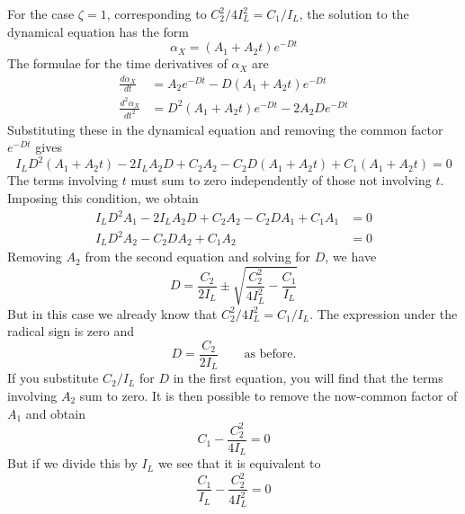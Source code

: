 For the case $\zeta = 1$, corresponding to $C_2^{2}/4I_L^{2} = C_1/I_L$, the
solution to the dynamical equation has the form
\begin{equation}\label{ch2:eq:22}
\alpha_X = (A_1 + A_2 t) e^{-Dt}
\end{equation}
The formulae for the time derivatives of $\alpha_X$ are
\begin{align*}
\frac{d\alpha_X}{dt} &= A_2 e^{-Dt} - D(A_1 + A_2 t) e^{-Dt}\\
\frac{d^{2}\alpha_X}{dt^{2}} &= D^{2}(A_1 + A_2 t) e^{-Dt} - 2A_2 D e^{-Dt}
\end{align*}
Substituting these in the dynamical equation and removing the common factor
$e^{-Dt}$ gives
\begin{equation*}
I_L D^{2}(A_1 + A_2 t) - 2 I_L A_2 D + C_2 A_2 - C_2 D(A_1 + A_2 t)
  + C_1 (A_1 + A_2 t) = 0
\end{equation*}
The terms involving $t$ must sum to zero independently of those not involving
$t$. Imposing this condition, we obtain
\begin{align*}
I_L D^{2} A_1 - 2 I_L A_2 D + C_2 A_2 - C_2 D A_1 + C_1 A_1 &= 0\\
I_L D^{2} A_2 - C_2 D A_2 + C_1 A_2 &= 0
\end{align*}
Removing $A_2$ from the second equation and solving for $D$, we have
\begin{equation*}
D = \frac{C_2}{2 I_L} \pm \sqrt{\frac{C_2^{2}}{4 I_L^{2}} - \frac{C_1}{I_L}}
\end{equation*}
But in this case we already know that $C_2^{2}/4I_L^{2} = C_1/I_L$. The
expression under the radical sign is zero and
\begin{equation*}
D = \frac{C_2}{2 I_L} \qquad \text{as before.}
\end{equation*}
If you substitute $C_2/I_L$ for $D$ in the first equation, you will find that
the terms involving $A_2$ sum to zero. It is then possible to remove the
now-common factor of $A_1$ and obtain
\begin{equation*}
C_1 - \frac{C_2^{2}}{4 I_L} = 0
\end{equation*}
But if we divide this by $I_L$ we see that it is equivalent to
\begin{equation*}
\frac{C_1}{I_L} - \frac{C_2^{2}}{4 I_L^{2}} = 0
\end{equation*}
